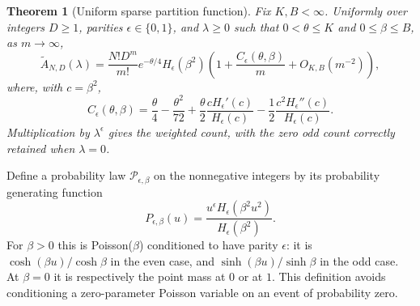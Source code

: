 \documentclass[11pt,letterpaper]{article}
\newtheorem{theorem}{Theorem}[section]
\theoremstyle{remark}\newtheorem{remark}[theorem]{Remark}
\begin{document}
\begin{theorem}[Uniform sparse partition function]\label{lcw:ulb:sp:thm:count}
Fix $K,B<\infty$. Uniformly over integers $D\geq1$, parities
$\epsilon\in\{0,1\}$, and $\lambda\geq0$ such that
$0<\theta\leq K$ and $0\leq\beta\leq B$, as $m\to\infty$,
\begin{equation}\label{lcw:ulb:sp:eq:count}
 \widetilde A_{N,D}(\lambda)
 =\frac{N!D^m}{m!}e^{-\theta/4}H_\epsilon(\beta^2)
 \left(1+\frac{C_\epsilon(\theta,\beta)}m+O_{K,B}(m^{-2})\right),
\end{equation}
where, with $c=\beta^2$,
\begin{equation}\label{lcw:ulb:sp:eq:C}
 C_\epsilon(\theta,\beta)
 =\frac\theta4-\frac{\theta^2}{72}
 +\frac\theta2\frac{cH_\epsilon'(c)}{H_\epsilon(c)}
 -\frac12\frac{c^2H_\epsilon''(c)}{H_\epsilon(c)}.
\end{equation}
Multiplication by $\lambda^\epsilon$ gives the weighted count, with
the zero odd count correctly retained when $\lambda=0$.
\end{theorem}

Define a probability law $\mathcal P_{\epsilon,\beta}$ on the
nonnegative integers by its probability generating function
\begin{equation}\label{lcw:ulb:sp:eq:paritylaw}
 P_{\epsilon,\beta}(u)
 =\frac{u^\epsilon H_\epsilon(\beta^2u^2)}{H_\epsilon(\beta^2)}.
\end{equation}
For $\beta>0$ this is Poisson($\beta$) conditioned to have parity
$\epsilon$: it is $\cosh(\beta u)/\cosh\beta$ in the even case,
and $\sinh(\beta u)/\sinh\beta$ in the odd case.
At $\beta=0$ it is respectively the point mass at $0$ or at $1$.
This definition avoids conditioning a zero-parameter Poisson variable
on an event of probability zero.
\end{document}
